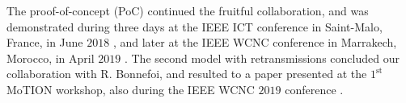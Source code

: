 The proof-of-concept (PoC) continued the fruitful collaboration, and was demonstrated during three days at the IEEE ICT conference in Saint-Malo, France, in June $2018$ \cite{Besson2018ICT}, and later at the IEEE WCNC conference in Marrakech, Morocco, in April $2019$ \cite{Besson2019WCNC}.
%
The second model with retransmissions concluded our collaboration with R. Bonnefoi, and resulted to a paper presented at the $1^{\text{st}}$ MoTION workshop, also during the IEEE WCNC $2019$ conference \cite{Bonnefoi2019WCNC}.



